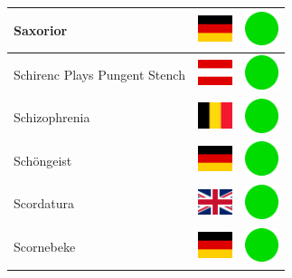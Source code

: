 \documentclass[12pt, a4paper, twoside]{report}
\begin{document}
\begin{center}
\begin{longtable}{|p{5cm}|p{2cm}|p{2cm}|}
 Saxorior                                                   & \includegraphics[width=1cm]{../4x3/de} &   \includegraphics[width=1cm]{../likes/y} \\ \hline
 Schirenc Plays Pungent Stench                              & \includegraphics[width=1cm]{../4x3/at} &   \includegraphics[width=1cm]{../likes/y} \\ \hline
 Schizophrenia                                              & \includegraphics[width=1cm]{../4x3/be} &   \includegraphics[width=1cm]{../likes/y} \\ \hline
 Schöngeist                                                 & \includegraphics[width=1cm]{../4x3/de} &   \includegraphics[width=1cm]{../likes/y} \\ \hline
 Scordatura                                                 & \includegraphics[width=1cm]{../4x3/gb} &   \includegraphics[width=1cm]{../likes/y} \\ \hline
 Scornebeke                                                 & \includegraphics[width=1cm]{../4x3/de} &   \includegraphics[width=1cm]{../likes/y} \\ \hline

\end{longtable}
\end{center}
\end{document}
